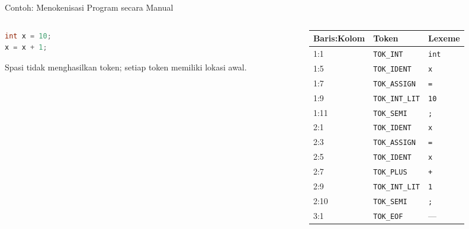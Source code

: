 \documentclass[aspectratio=169,10pt,t]{beamer}
\begin{document}
\begin{frame}[fragile]{Contoh: Menokenisasi Program secara Manual}
  \begin{columns}[T,onlytextwidth]
    \begin{column}{0.36\textwidth}
      \begin{lstlisting}[language=C,numbers=none,
        caption={Program uji tokenisasi}]
int x = 10;
x = x + 1;
      \end{lstlisting}
      \vspace{2pt}
      {\scriptsize Spasi tidak menghasilkan token; setiap token
      memiliki lokasi awal.}
    \end{column}
    \begin{column}{0.60\textwidth}
      \scriptsize
      \setlength{\tabcolsep}{4pt}
      \begin{tabular}{@{}p{1.9cm}p{3.5cm}p{2.6cm}@{}}
        \toprule
        \textbf{Baris:Kolom} & \textbf{Token} & \textbf{Lexeme} \\
        \midrule
        1:1 & \texttt{TOK\_INT} & \texttt{int} \\
        1:5 & \texttt{TOK\_IDENT} & \texttt{x} \\
        1:7 & \texttt{TOK\_ASSIGN} & \texttt{=} \\
        1:9 & \texttt{TOK\_INT\_LIT} & \texttt{10} \\
        1:11 & \texttt{TOK\_SEMI} & \texttt{;} \\
        2:1 & \texttt{TOK\_IDENT} & \texttt{x} \\
        2:3 & \texttt{TOK\_ASSIGN} & \texttt{=} \\
        2:5 & \texttt{TOK\_IDENT} & \texttt{x} \\
        2:7 & \texttt{TOK\_PLUS} & \texttt{+} \\
        2:9 & \texttt{TOK\_INT\_LIT} & \texttt{1} \\
        2:10 & \texttt{TOK\_SEMI} & \texttt{;} \\
        3:1 & \texttt{TOK\_EOF} & --- \\
        \bottomrule
      \end{tabular}
    \end{column}
  \end{columns}
\end{frame}
\end{document}
